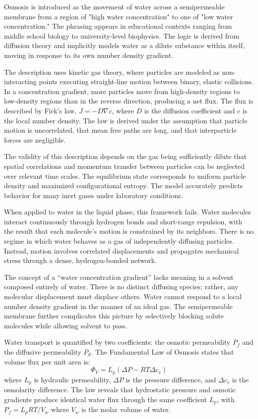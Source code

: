 Osmosis is introduced as the movement of water across a semipermeable membrane from a region of "high water concentration" to one of "low water concentration." The phrasing appears in educational contexts ranging from middle school biology to university-level biophysics. The logic is derived from diffusion theory and implicitly models water as a dilute substance within itself, moving in response to its own number density gradient.

The description uses kinetic gas theory, where particles are modeled as non-interacting points executing straight-line motion between binary, elastic collisions. In a concentration gradient, more particles move from high-density regions to low-density regions than in the reverse direction, producing a net flux. The flux is described by Fick's law, $J = -D \nabla c$, where $D$ is the diffusion coefficient and $c$ is the local number density. The law is derived under the assumption that particle motion is uncorrelated, that mean free paths are long, and that interparticle forces are negligible.

The validity of this description depends on the gas being sufficiently dilute that spatial correlations and momentum transfer between particles can be neglected over relevant time scales. The equilibrium state corresponds to uniform particle density and maximized configurational entropy. The model accurately predicts behavior for many inert gases under laboratory conditions.

When applied to water in the liquid phase, this framework fails. Water molecules interact continuously through hydrogen bonds and short-range repulsion, with the result that each molecule’s motion is constrained by its neighbors. There is no regime in which water behaves as a gas of independently diffusing particles. Instead, motion involves correlated displacements and propagates mechanical stress through a dense, hydrogen-bonded network.

The concept of a “water concentration gradient” lacks meaning in a solvent composed entirely of water. There is no distinct diffusing species; rather, any molecular displacement must displace others. Water cannot respond to a local number density gradient in the manner of an ideal gas. The semipermeable membrane further complicates this picture by selectively blocking solute molecules while allowing solvent to pass.

Water transport is quantified by two coefficients: the osmotic permeability $P_f$ and the diffusive permeability $P_d$. The Fundamental Law of Osmosis states that volume flux per unit area is:
\[
\Phi_V = L_p(\Delta P - RT\Delta c_s)
\]
where $L_p$ is hydraulic permeability, $\Delta P$ is the pressure difference, and $\Delta c_s$ is the osmolarity difference. The law reveals that hydrostatic pressure and osmotic gradients produce identical water flux through the same coefficient $L_p$, with $P_f = L_p RT/V_w$ where $V_w$ is the molar volume of water.

